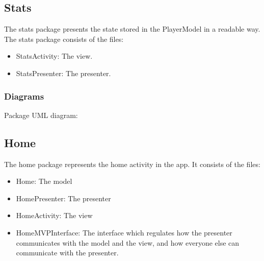 \documentclass{article}
\begin{document}
\subsection{Stats}
The stats package presents the state stored in the PlayerModel in a readable way.\\
The stats package consists of the files:
\begin{itemize}
    \item StatsActivity: The view.
    \item StatsPresenter: The presenter.
\end{itemize}

\subsubsection{Diagrams}
\begin{center}
    Package UML diagram:\\
\end{center}

\subsection{Home}
The home package represents the home activity in the app. It consists of the files:
\begin{itemize}
    \item Home: The model
    \item HomePresenter: The presenter
    \item HomeActivity: The view
    \item HomeMVPInterface: The interface which regulates how the presenter communicates with the model and the view, and how everyone else can communicate with the presenter.
\end{itemize}
\end{document}
